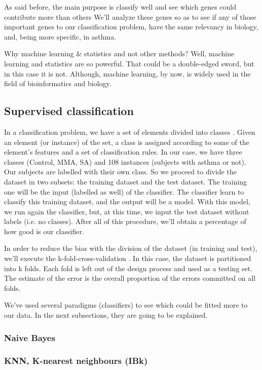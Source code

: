 \documentclass[conference,a4paper]{IEEEtran}
\begin{document}
As said before, the main purpose is classify well and see which genes could contribute more than others We'll analyze these genes so as to see if any of those important genes to our classification problem, have the same relevancy in biology, and, being more specific, in asthma.

Why machine learning \& statistics and not other methods? Well, machine learning and statistics are so powerful. That could be a double-edged sword, but in this case it is not. Although, machine learning, by now, is widely used in the field of bioinformatics and biology.

\subsection{Supervised classification}

In a classification problem, we have a set of elements divided into classes \cite{machineBioinfo}. Given an element (or instance) of the set, a class is assigned according to some of the element's features and a set of classification rules. In our case, we have three classes (Control, MMA, SA) and 108 instances (subjects with asthma or not). Our subjects are labelled with their own class. So we proceed to divide the dataset in two subsets: the training dataset and the test dataset. The training one will be the input (labelled as well) of the classifier. The classifier learn to classify this training dataset, and the output will be a model. With this model, we run again the classifier, but, at this time, we input the test dataset without labels (i.e. no classes). After all of this procedure, we'll obtain a percentage of how good is our classifier.

In order to reduce the bias with the division of the dataset (in training and test), we'll execute the k-fold-cross-validation \cite{CrossValidation}. In this case, the dataset is partitioned into k folds. Each fold is left out of the design process and used as a testing set. The estimate of the error is the overall proportion of the errors committed on all folds.

We've used several paradigms (classifiers) to see which could be fitted more to our data. In the next subsections, they are going to be explained.

\subsubsection{Naive Bayes}

\subsubsection{KNN, K-nearest neighbours (IBk)}
\end{document}
